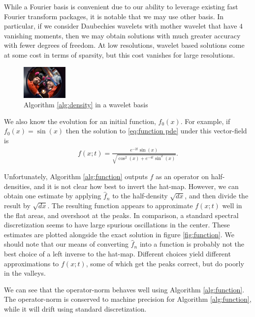 \documentclass[12pt]{amsart}
\begin{document}
While a Fourier basis is convenient due to our ability to leverage existing fast Fourier transform packages, it is notable that we may use other basis.
In particular, if we consider Daubechies wavelets with mother wavelet that have $4$ vanishing moments, then we may obtain solutions with much greater
accuracy with fewer degrees of freedom. 
At low resolutions, wavelet based solutions come at some cost in terms of sparsity, but this cost vanishes for large resolutions.

\begin{figure}[h]
	\centering
	\includegraphics[width=0.2\textwidth]{./images/placeholder}
	\caption{Algorithm \ref{alg:density} in a wavelet basis}
\end{figure}


We also know the evolution for an initial function, $f_{0}(x)$.
For example, if $f_{0}(x) = \sin(x)$ then the solution to \eqref{eq:function pde} under this vector-field is
\begin{align}
	f(x;t) = \frac{ e^{-2t} \sin(x) }{ \sqrt{ \cos^{2}(x) + e^{-4t} \sin^{2}(x) } }.
\end{align}

Unfortunately, Algorithm \ref{alg:function} outputs $f$ as an operator on half-densities, and it is not clear how best to invert the hat-map.
However, we can obtain one estimate by applying $\hat{f}_{n}$ to the half-density $\sqrt{dx}$, and then divide the result by $\sqrt{dx}$.
The resulting function appears to approximate $f(x;t)$ well in the flat areas, and overshoot at the peaks.
In comparison, a standard spectral discretization seems to have large spurious oscillations in the center.
These estimates are plotted alongside the exact solution in figure \ref{fig:function}.
We should note that our means of converting $\hat{f}_{n}$ into a function is probably not the best choice of a left inverse to the hat-map.
Different choices yield different approximations to $f(x;t)$, some
of which get the peaks correct, but do poorly in the valleys.

We can see that the operator-norm behaves well using Algorithm \ref{alg:function}.
The operator-norm is conserved to machine precision for Algorithm \ref{alg:function}, while it will drift using standard discretization.
\end{document}
